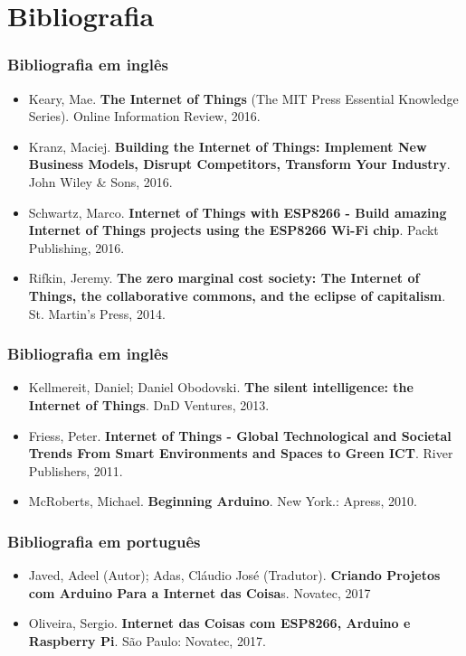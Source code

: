 \documentclass{beamer}
\begin{document}
\section{Bibliografia}

\begin{frame}
\frametitle{Bibliografia em inglês}
\begin{itemize}
	\item Keary, Mae. \textbf{The Internet of Things} (The MIT Press Essential Knowledge Series). Online Information Review, 2016.

	\item Kranz, Maciej. \textbf{Building the Internet of Things: Implement New Business Models, Disrupt Competitors, Transform Your Industry}. John Wiley \& Sons, 2016.

	\item Schwartz, Marco. \textbf{Internet of Things with ESP8266 - Build amazing Internet of Things projects using the ESP8266 Wi-Fi chip}. Packt Publishing, 2016.

	\item Rifkin, Jeremy. \textbf{The zero marginal cost society: The Internet of Things, the collaborative commons, and the eclipse of capitalism}. St. Martin's Press, 2014.
\end{itemize}
\end{frame}

\begin{frame}
\frametitle{Bibliografia em inglês}
\begin{itemize}
\item Kellmereit, Daniel; Daniel Obodovski. \textbf{The silent intelligence: the Internet of Things}. DnD Ventures, 2013.

\item Friess, Peter. \textbf{Internet of Things - Global Technological and Societal Trends From Smart Environments and Spaces to Green ICT}. River Publishers, 2011.

\item McRoberts, Michael. \textbf{Beginning Arduino}. New York.: Apress, 2010.

\end{itemize}
\end{frame}

\begin{frame}
\frametitle{Bibliografia em português}
	\begin{itemize}
		\item Javed, Adeel (Autor); Adas, Cláudio José (Tradutor). \textbf{Criando Projetos com Arduino Para a Internet das Coisa}s. Novatec, 2017

		\item Oliveira, Sergio. \textbf{Internet das Coisas com ESP8266, Arduino e Raspberry Pi}. São Paulo: Novatec, 2017.
	\end{itemize}
\end{frame}
\end{document}
